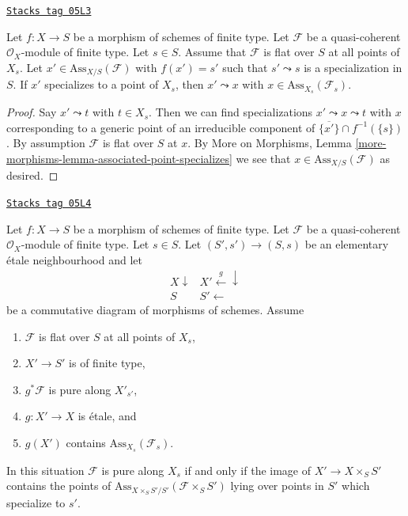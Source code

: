 \begin{lemma}
\label{flat-lemma-associated-point-specializes}
\href{https://stacks.math.columbia.edu/tag/05L3}{\texttt{Stacks tag 05L3}}

Let $f : X \to S$ be a morphism of schemes of finite type.
Let $\mathcal{F}$ be a quasi-coherent $\mathcal{O}_X$-module of finite type.
Let $s \in S$.
Assume that $\mathcal{F}$ is flat over $S$ at all points of $X_s$.
Let $x' \in \text{Ass}_{X/S}(\mathcal{F})$ with $f(x') = s'$
such that $s' \leadsto s$ is a specialization in $S$. If
$x'$ specializes to a point of $X_s$, then $x' \leadsto x$
with $x \in \text{Ass}_{X_s}(\mathcal{F}_s)$.
\end{lemma}

\begin{proof}
Say $x' \leadsto t$ with $t \in X_s$. Then we can find specializations
$x' \leadsto x \leadsto t$ with $x$ corresponding to a generic
point of an irreducible component of
$\overline{\{x'\}} \cap f^{-1}(\{s\})$. By assumption $\mathcal{F}$ is flat
over $S$ at $x$. By More on Morphisms, Lemma
\ref{more-morphisms-lemma-associated-point-specializes}
we see that $x \in \text{Ass}_{X/S}(\mathcal{F})$ as desired.
\end{proof}

\begin{lemma}[Criterion]
\label{flat-lemma-criterion}
\href{https://stacks.math.columbia.edu/tag/05L4}{\texttt{Stacks tag 05L4}}

Let $f : X \to S$ be a morphism of schemes of finite type.
Let $\mathcal{F}$ be a quasi-coherent $\mathcal{O}_X$-module
of finite type. Let $s \in S$. Let $(S', s') \to (S, s)$ be an
elementary \'etale neighbourhood and let
$$
\begin{array}{cc}X \downarrow & X' \overset{g}{\longleftarrow}\downarrow \\ S & S' \longleftarrow\end{array}
$$
be a commutative diagram of morphisms of schemes. Assume
\begin{enumerate}
\item $\mathcal{F}$ is flat over $S$ at all points of $X_s$,
\item $X' \to S'$ is of finite type,
\item $g^*\mathcal{F}$ is pure along $X'_{s'}$,
\item $g : X' \to X$ is \'etale, and
\item $g(X')$ contains $\text{Ass}_{X_s}(\mathcal{F}_s)$.
\end{enumerate}
In this situation $\mathcal{F}$ is pure along $X_s$ if and only
if the image of $X' \to X \times_S S'$ contains the points of
$\text{Ass}_{X \times_S S'/S'}(\mathcal{F} \times_S S')$
lying over points in $S'$ which specialize to $s'$.
\end{lemma}

